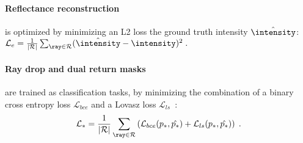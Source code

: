 \paragraph{Reflectance reconstruction}
is optimized by minimizing an L2 loss \wrt the ground truth intensity $\hat{\intensity}$:~$\mathcal{L}_e = \frac{1}{|\mathcal{R}|} \sum_{\ray \in \mathcal{R}} (\hat{\intensity} - \intensity)^2\;.$  


\paragraph{Ray drop and dual return masks} 
are trained as classification tasks, by minimizing the combination of a binary cross entropy loss $\mathcal{L}_{bce}$ and a Lovasz loss $\mathcal{L}_{ls}$~\cite{berman2018lovasz}:
\begin{equation}
     \mathcal{L}_* = \frac{1}{|\mathcal{R}|} \sum_{\ray \in \mathcal{R}} \left(\mathcal{L}_{bce}(p_*, \hat{p_*}) + \mathcal{L}_{ls}(p_*, \hat{p_*}) \right)\;.
\end{equation}